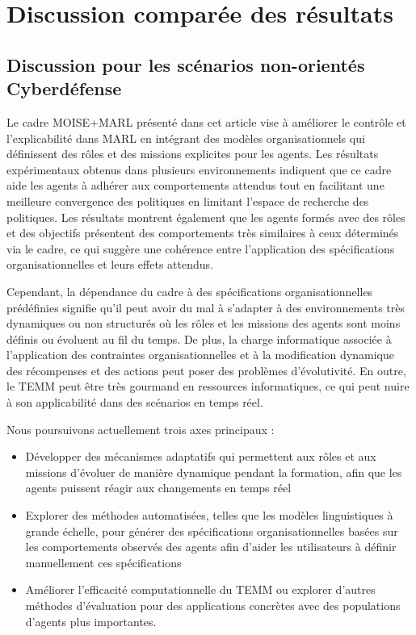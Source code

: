 \section{Discussion comparée des résultats}

\subsection{Discussion pour les scénarios non-orientés Cyberdéfense}
\label{sec:discussion_conclusion_future_work}

Le cadre MOISE+MARL présenté dans cet article vise à améliorer le contrôle et l'explicabilité dans MARL en intégrant des modèles organisationnels qui définissent des rôles et des missions explicites pour les agents. Les résultats expérimentaux obtenus dans plusieurs environnements indiquent que ce cadre aide les agents à adhérer aux comportements attendus tout en facilitant une meilleure convergence des politiques en limitant l'espace de recherche des politiques. Les résultats montrent également que les agents formés avec des rôles et des objectifs présentent des comportements très similaires à ceux déterminés via le cadre, ce qui suggère une cohérence entre l'application des spécifications organisationnelles et leurs effets attendus.

Cependant, la dépendance du cadre à des spécifications organisationnelles prédéfinies signifie qu'il peut avoir du mal à s'adapter à des environnements très dynamiques ou non structurés où les rôles et les missions des agents sont moins définis ou évoluent au fil du temps.
De plus, la charge informatique associée à l'application des contraintes organisationnelles et à la modification dynamique des récompenses et des actions peut poser des problèmes d'évolutivité. En outre, le TEMM peut être très gourmand en ressources informatiques, ce qui peut nuire à son applicabilité dans des scénarios en temps réel.

Nous poursuivons actuellement trois axes principaux :
%
\begin{itemize}
  \item Développer des mécanismes adaptatifs qui permettent aux rôles et aux missions d'évoluer de manière dynamique pendant la formation, afin que les agents puissent réagir aux changements en temps réel
  \item Explorer des méthodes automatisées, telles que les modèles linguistiques à grande échelle, pour générer des spécifications organisationnelles basées sur les comportements observés des agents afin d'aider les utilisateurs à définir manuellement ces spécifications
  \item Améliorer l'efficacité computationnelle du TEMM ou explorer d'autres méthodes d'évaluation pour des applications concrètes avec des populations d'agents plus importantes.
\end{itemize}

